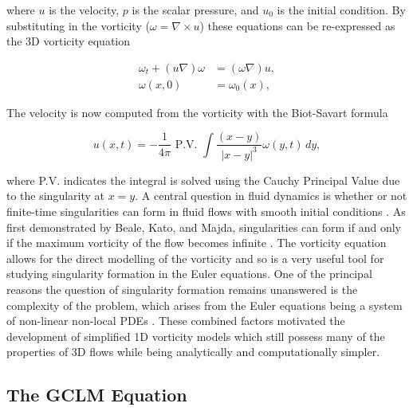 \documentclass[12pt]{article}
\def\w{\omega}
\def\wt{\omega_t}
\numberwithin{equation}{section}
\begin{document}
\vspace{-10pt}

\noindent
where $u$ is the velocity, $p$ is the scalar pressure, and $u_0$ is the initial condition. By substituting in the vorticity ($\w = \nabla \times u$) these equations can be re-expressed as the 3D vorticity equation

\vspace{-30pt}

\begin{subequations}\label{eq:3D:Vorticity}
\begin{align}
\wt + (u\nabla)\w &= (\w\nabla)u,\\
\w(x,0) &= \w_0(x),
\end{align}
\end{subequations}

\vspace{-10pt}

\noindent
The velocity is now computed from the vorticity with the Biot-Savart formula 

\vspace{-10pt}

\begin{equation}\label{eq:3D:Vel:Vort}
u(x,t) = -\frac{1}{4\pi}\text{ P.V. }\int \frac{(x-y)}{|x-y|^3}\w(y,t)\,dy,
\end{equation}

\noindent
where P.V. indicates the integral is solved using the Cauchy Principal Value due to the singularity at $x=y$. A central question in fluid dynamics is whether or not finite-time singularities can form in fluid flows with smooth initial conditions \cite{constantin_simple_1985}. As first demonstrated by Beale, Kato, and Majda, singularities can form if and only if the maximum vorticity of the flow becomes infinite \cite{beale_remarks_1984}. The vorticity equation allows for the direct modelling of the vorticity and so is a very useful tool for studying singularity formation in the Euler equations. One of the principal reasons the question of singularity formation remains unanswered is the complexity of the problem, which arises from the Euler equations being a system of non-linear non-local PDEs \cite{elgindi_effects_2017}. These combined factors motivated the development of simplified 1D vorticity models which still possess many of the properties of 3D flows while being analytically and computationally simpler.

\subsection{The GCLM Equation}
\end{document}
